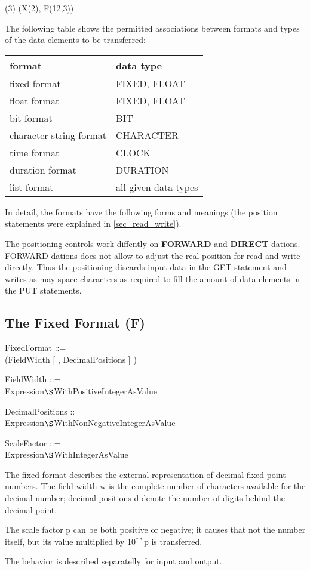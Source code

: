 (3) (X(2), F(12,3))

The following table shows the permitted associations between formats and
types of the data elements to be transferred:

\begin{tabular}{ll}
format                  & data type \\ \hline
fixed format            & FIXED, FLOAT \\
float format            & FIXED, FLOAT \\
bit format              & BIT          \\
character string format & CHARACTER    \\
time format             & CLOCK        \\
duration format         & DURATION     \\
list format             & all given data types
\end{tabular}

In detail, the formats have the following forms and meanings (the
position statements were explained in \ref{sec_read_write}).

\begin{accepted}
The positioning controls work diffently on {\bf FORWARD} and {\bf DIRECT}
dations. FORWARD dations does not allow to adjust the real position for read
and write directly. 
Thus the positioning discards input data in the GET statement and 
writes as may space characters as required to fill the amount of data elements
in the PUT statements.
\end{accepted}


\subsection{The Fixed Format (F)}   %
\label{sec_dation_f_format}

FixedFormat ::=\\
 (FieldWidth [ , DecimalPositions \removedtext{[ , ScaleFactor ]} ] )

FieldWidth ::=\\
\x Expression$\S $WithPositiveIntegerAsValue

DecimalPositions ::=\\
\x Expression$\S $WithNonNegativeIntegerAsValue

\begin{removed}
ScaleFactor ::=\\
\x Expression$\S $WithIntegerAsValue
\end{removed}
The fixed format describes the external representation of decimal fixed
point numbers. The field width w is the complete number of characters
available for the decimal number; decimal positions d denote the number
of digits behind the decimal point. 
\begin{removed}
The scale factor p can be both
positive or negative; 
it causes that not the number itself, but its
value multiplied by 10$^{**}$p is transferred.
\end{removed}
\begin{accepted}
The behavior is described separatelly for input and output.
\end{accepted}

